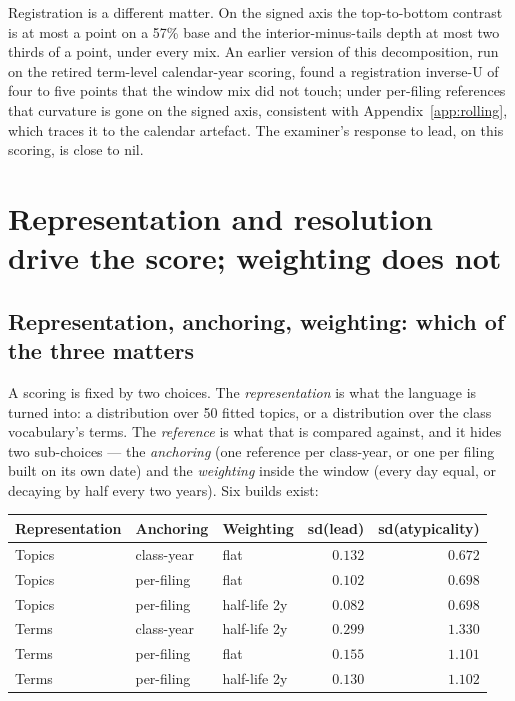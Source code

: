 Registration is a different matter. On the signed axis the top-to-bottom
contrast is at most a point on a 57\% base and the interior-minus-tails
depth at most two thirds of a point, under every mix. An earlier version of
this decomposition, run on the retired term-level calendar-year scoring,
found a registration inverse-U of four to five points that the window mix
did not touch; under per-filing references that curvature is gone on the
signed axis, consistent with Appendix~\ref{app:rolling}, which traces it to
the calendar artefact. The examiner's response to lead, on this scoring, is
close to nil.

\section{Representation and resolution drive the score; weighting does not}\label{app:choices}

\subsection{Representation, anchoring, weighting: which of the three matters}

A scoring is fixed by two choices. The \emph{representation} is what the
language is turned into: a distribution over 50 fitted topics, or a
distribution over the class vocabulary's terms. The \emph{reference} is what
that is compared against, and it hides two sub-choices --- the
\emph{anchoring} (one reference per class-year, or one per filing built on its
own date) and the \emph{weighting} inside the window (every day equal, or
decaying by half every two years). Six builds exist:

\begin{center}\small
\begin{tabular}{lllrr}
\toprule
Representation & Anchoring & Weighting & sd(lead) & sd(atypicality) \\
\midrule
Topics & class-year & flat          & $0.132$ & $0.672$ \\
Topics & per-filing & flat          & $0.102$ & $0.698$ \\
Topics & per-filing & half-life 2y  & $0.082$ & $0.698$ \\
Terms  & class-year & half-life 2y  & $0.299$ & $1.330$ \\
Terms  & per-filing & flat          & $0.155$ & $1.101$ \\
Terms  & per-filing & half-life 2y  & $0.130$ & $1.102$ \\
\bottomrule
\end{tabular}
\end{center}

